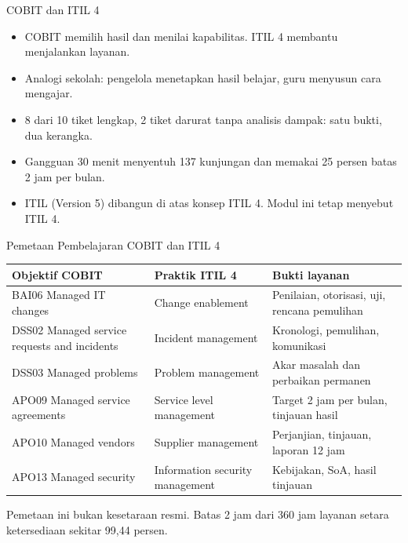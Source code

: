\documentclass[aspectratio=169, table, 12pt]{beamer}
\begin{document}
\begin{frame}{{\Large COBIT dan ITIL 4}}
  \vspace{6pt}
  \small
  \begin{itemize}
    \item COBIT memilih hasil dan menilai kapabilitas. ITIL 4 membantu menjalankan layanan.
    \item Analogi sekolah: pengelola menetapkan hasil belajar, guru menyusun cara mengajar.
    \item 8 dari 10 tiket lengkap, 2 tiket darurat tanpa analisis dampak: satu bukti, dua kerangka.
    \item Gangguan 30 menit menyentuh 137 kunjungan dan memakai 25 persen batas 2 jam per bulan.
    \item ITIL (Version 5) dibangun di atas konsep ITIL 4. Modul ini tetap menyebut ITIL 4.
  \end{itemize}
\end{frame}

\begin{frame}{{\Large Pemetaan Pembelajaran COBIT dan ITIL 4}}
  \vspace{2pt}
  \scriptsize
  \begin{tabularx}{\textwidth}{|>{\raggedright\arraybackslash}p{}|>{\raggedright\arraybackslash}p{}|>{\raggedright\arraybackslash}X|}
    \hline
    \textbf{Objektif COBIT} & \textbf{Praktik ITIL 4} & \textbf{Bukti layanan} \\ \hline
    BAI06 Managed IT changes & Change enablement & Penilaian, otorisasi, uji, rencana pemulihan \\
    \hline
    DSS02 Managed service requests and incidents & Incident management & Kronologi, pemulihan,
    komunikasi \\ \hline
    DSS03 Managed problems & Problem management & Akar masalah dan perbaikan permanen \\ \hline
    APO09 Managed service agreements & Service level management & Target 2 jam per bulan, tinjauan
    hasil \\ \hline
    APO10 Managed vendors & Supplier management & Perjanjian, tinjauan, laporan 12 jam \\ \hline
    APO13 Managed security & Information security management & Kebijakan, SoA, hasil tinjauan \\
    \hline
  \end{tabularx}

  \vspace{6pt}
  \small Pemetaan ini bukan kesetaraan resmi. Batas 2 jam dari 360 jam layanan setara ketersediaan
  sekitar 99,44 persen.
\end{frame}
\end{document}
